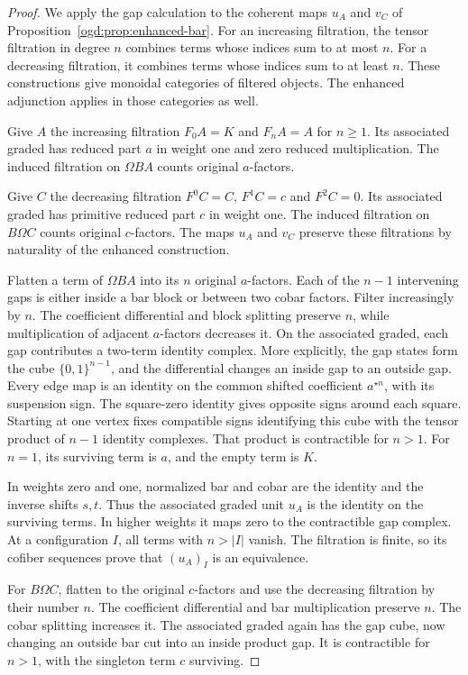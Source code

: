 \begin{proof}
We apply the gap calculation to the coherent maps $u_A$ and $v_C$ of
Proposition~\ref{ogd:prop:enhanced-bar}.
For an increasing filtration, the tensor filtration in degree $n$ combines terms whose indices sum to at most $n$.
For a decreasing filtration, it combines terms whose indices sum to at least $n$.
These constructions give monoidal categories of filtered objects.
The enhanced adjunction applies in those categories as well.

Give $A$ the increasing filtration $F_0A=K$ and $F_nA=A$ for $n\geq1$.
Its associated graded has reduced part $a$ in weight one and zero reduced multiplication.
The induced filtration on $\Omega BA$ counts original $a$-factors.

Give $C$ the decreasing filtration $F^0C=C$, $F^1C=c$ and $F^2C=0$.
Its associated graded has primitive reduced part $c$ in weight one.
The induced filtration on $B\Omega C$ counts original $c$-factors.
The maps $u_A$ and $v_C$ preserve these filtrations by naturality of the enhanced construction.

Flatten a term of \(\Omega BA\) into its \(n\) original \(a\)-factors.
Each of the \(n-1\) intervening gaps is either inside a bar block or between two cobar factors.
Filter increasingly by \(n\).
The coefficient differential and block splitting preserve \(n\), while multiplication of adjacent \(a\)-factors decreases it.
On the associated graded, each gap contributes a two-term identity complex.
More explicitly, the gap states form the cube \(\{0,1\}^{n-1}\), and the differential changes an inside gap to an outside gap.
Every edge map is an identity on the common shifted coefficient \(a^{\star n}\), with its suspension sign.
The square-zero identity gives opposite signs around each square.
Starting at one vertex fixes compatible signs identifying this cube with the tensor product of \(n-1\) identity complexes.
That product is contractible for \(n>1\).
For \(n=1\), its surviving term is \(a\), and the empty term is \(K\).

In weights zero and one, normalized bar and cobar are the identity and the inverse shifts $s,t$.
Thus the associated graded unit $u_A$ is the identity on the surviving terms.
In higher weights it maps zero to the contractible gap complex.
At a configuration $I$, all terms with $n>|I|$ vanish.
The filtration is finite, so its cofiber sequences prove that $(u_A)_I$ is an equivalence.

For \(B\Omega C\), flatten to the original \(c\)-factors and use the decreasing filtration by their number \(n\).
The coefficient differential and bar multiplication preserve \(n\).
The cobar splitting increases it.
The associated graded again has the gap cube, now changing an outside bar cut into an inside product gap.
It is contractible for \(n>1\), with the singleton term \(c\) surviving.


\end{proof}
